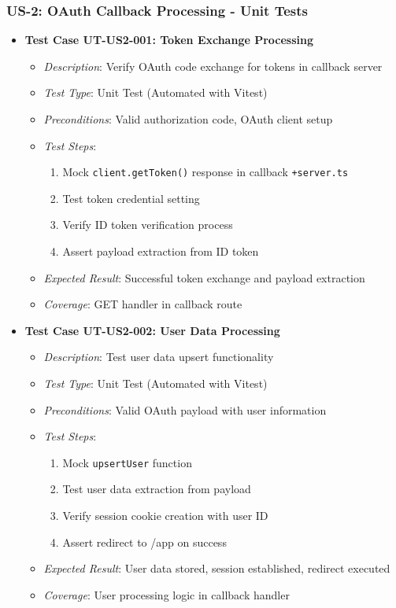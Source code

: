 \documentclass[12pt]{article}
\begin{document}
\subsubsection{US-2: OAuth Callback Processing - Unit Tests}
\begin{itemize}
  \item \textbf{Test Case UT-US2-001: Token Exchange Processing}
    \begin{itemize}
      \item \textit{Description}: Verify OAuth code exchange for tokens in callback server
      \item \textit{Test Type}: Unit Test (Automated with Vitest)
      \item \textit{Preconditions}: Valid authorization code, OAuth client setup
      \item \textit{Test Steps}:
        \begin{enumerate}
          \item Mock \texttt{client.getToken()} response in callback \texttt{+server.ts}
          \item Test token credential setting
          \item Verify ID token verification process
          \item Assert payload extraction from ID token
        \end{enumerate}
      \item \textit{Expected Result}: Successful token exchange and payload extraction
      \item \textit{Coverage}: GET handler in callback route
    \end{itemize}

  \item \textbf{Test Case UT-US2-002: User Data Processing}
    \begin{itemize}
      \item \textit{Description}: Test user data upsert functionality
      \item \textit{Test Type}: Unit Test (Automated with Vitest)
      \item \textit{Preconditions}: Valid OAuth payload with user information
      \item \textit{Test Steps}:
        \begin{enumerate}
          \item Mock \texttt{upsertUser} function
          \item Test user data extraction from payload
          \item Verify session cookie creation with user ID
          \item Assert redirect to /app on success
        \end{enumerate}
      \item \textit{Expected Result}: User data stored, session established, redirect executed
      \item \textit{Coverage}: User processing logic in callback handler
    \end{itemize}
\end{itemize}
\end{document}
